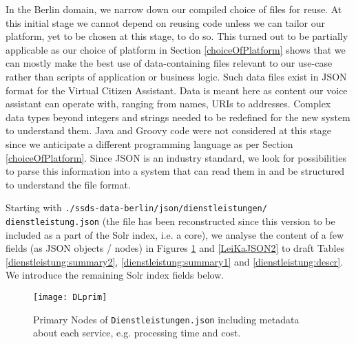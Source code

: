 In the Berlin domain, we narrow down our compiled choice of files for reuse. At this initial stage we cannot depend on reusing code unless we can tailor our platform, yet to be chosen at this stage, to do so. This turned out to be partially applicable as our choice of platform in Section \ref{choiceOfPlatform} shows that we can mostly make the best use of data-containing files relevant to our use-case rather than scripts of application or business logic. Such data files exist in JSON format for the Virtual Citizen Assistant. Data is meant here as %
content our voice assistant can operate with, ranging from names, URIs to addresses. Complex data types beyond integers and strings needed to be redefined for the new system to understand them. 
Java and Groovy code were not considered at this stage since we anticipate a different programming language as per Section \ref{choiceOfPlatform}. Since JSON is an industry standard, we look for possibilities to parse this information into a system that can read them in and be structured to understand the file format. 

Starting with \texttt{./ssds-data-berlin/json/dienstleistungen/} \texttt{dienstleistung.json} (the file has been reconstructed since this version to be included as a part of the Solr index, i.e. a core), we analyse the content of a few fields (as JSON objects / nodes) in Figures \ref{LeiKaJSON1} and \ref{LeiKaJSON2} to draft Tables \ref{dienstleistung:summary2}, \ref{dienstleistung:summary1} and \ref{dienstleistung:descr}. We introduce the remaining Solr index fields below.






%

\begin{figure}[H]
	\caption[Structure of  \texttt{Dienstleistungen.json}]{Primary Nodes of \texttt{Dienstleistungen.json} including metadata about each service, e.g. processing time and cost.}
	\label{LeiKaJSON1}
	\texttt{[image: DLprim]}
\end{figure}

